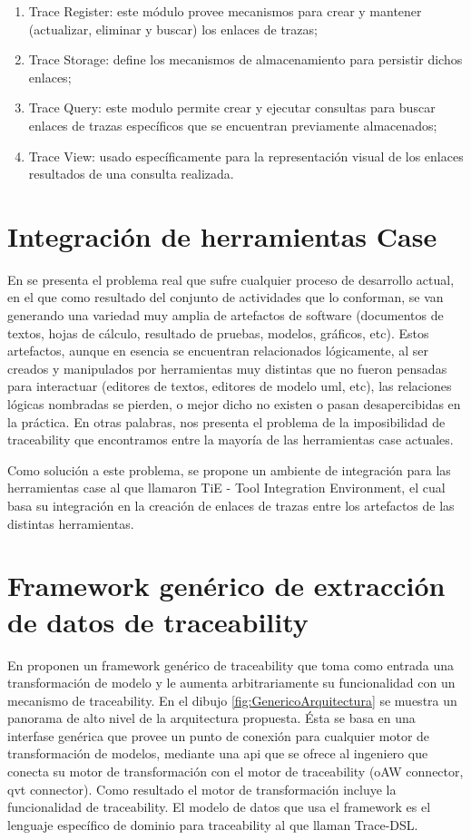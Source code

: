 \documentclass[a4paper,12pt,oneside,spanish]{book}
\begin{document}
\begin{enumerate}
\item Trace Register: este módulo provee mecanismos para crear y mantener (actualizar, eliminar y buscar) los enlaces de trazas;
\item Trace Storage: define los mecanismos de almacenamiento para persistir dichos enlaces;
\item Trace Query: este modulo permite crear y ejecutar consultas para buscar enlaces de trazas específicos que se encuentran previamente almacenados;
\item Trace View: usado específicamente para la representación visual de los enlaces resultados de una consulta realizada.
\end{enumerate}


\section{Integración de herramientas Case}

En \cite{KlarRoseSchurr} se presenta el problema real que sufre cualquier proceso de desarrollo actual, en el que como resultado del conjunto de actividades que lo conforman, se van generando una variedad muy amplia de artefactos de software (documentos de textos, hojas de cálculo, resultado de pruebas, modelos, gráficos, etc). Estos artefactos, aunque en esencia se encuentran relacionados lógicamente, al ser creados y manipulados por herramientas muy distintas que no fueron pensadas para interactuar (editores de textos, editores de modelo \gls{uml}, etc), las relaciones lógicas nombradas se pierden, o mejor dicho no existen o pasan desapercibidas en la práctica. En otras palabras, nos presenta el problema de la imposibilidad de traceability que encontramos entre la mayoría de las herramientas \gls{case} actuales.

Como solución a este problema, se propone un ambiente de integración para las herramientas \gls{case} al que llamaron TiE - Tool Integration Environment, el cual basa su integración en la creación de enlaces de trazas entre los artefactos de las distintas herramientas.

\section{Framework genérico de extracción de datos de traceability}

En \cite{GrammelKastenholz} proponen un framework genérico de traceability que toma como entrada una transformación de modelo y le aumenta arbitrariamente su funcionalidad con un mecanismo de traceability. En el dibujo \ref{fig:GenericoArquitectura} se muestra un panorama de alto nivel de la arquitectura propuesta. Ésta se basa en una interfase genérica que provee un punto de conexión para cualquier motor de transformación de modelos, mediante una \gls{api} que se ofrece al ingeniero que conecta su motor de transformación con el motor de traceability (oAW connector, \gls{qvt} connector). Como resultado el motor de transformación incluye la funcionalidad de traceability. El modelo de datos que usa el framework es el lenguaje específico de dominio para traceability al que llaman Trace-DSL.
\end{document}
